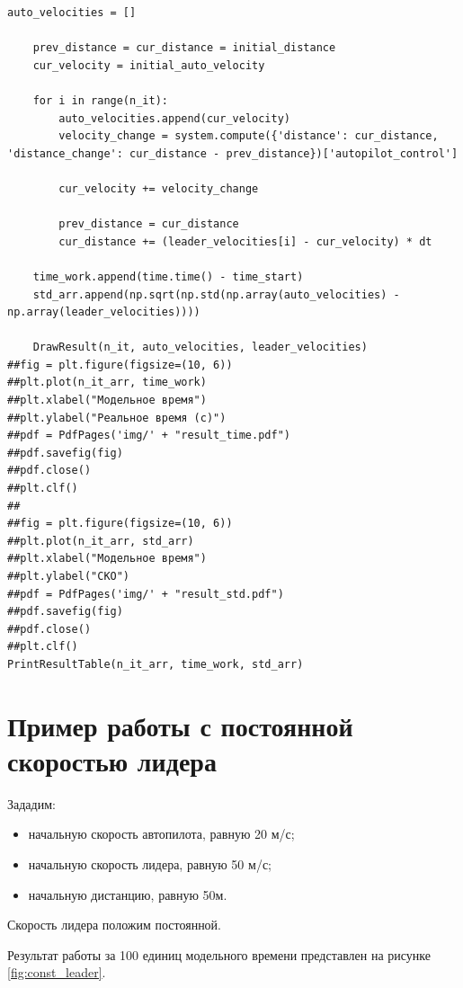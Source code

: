 \documentclass[12pt]{report}
\begin{document}
\begin{lstlisting}[label=lst:dt,caption=Реализация решения поставленной задачи]
    auto_velocities = []
    
    prev_distance = cur_distance = initial_distance
    cur_velocity = initial_auto_velocity

    for i in range(n_it):
        auto_velocities.append(cur_velocity)
        velocity_change = system.compute({'distance': cur_distance, 'distance_change': cur_distance - prev_distance})['autopilot_control']

        cur_velocity += velocity_change

        prev_distance = cur_distance
        cur_distance += (leader_velocities[i] - cur_velocity) * dt

    time_work.append(time.time() - time_start)
    std_arr.append(np.sqrt(np.std(np.array(auto_velocities) - np.array(leader_velocities))))

    DrawResult(n_it, auto_velocities, leader_velocities)
##fig = plt.figure(figsize=(10, 6))
##plt.plot(n_it_arr, time_work)
##plt.xlabel("Модельное время")
##plt.ylabel("Реальное время (с)")
##pdf = PdfPages('img/' + "result_time.pdf")
##pdf.savefig(fig)
##pdf.close()
##plt.clf()
##
##fig = plt.figure(figsize=(10, 6))
##plt.plot(n_it_arr, std_arr)
##plt.xlabel("Модельное время")
##plt.ylabel("СКО")
##pdf = PdfPages('img/' + "result_std.pdf")
##pdf.savefig(fig)
##pdf.close()
##plt.clf()
PrintResultTable(n_it_arr, time_work, std_arr)
\end{lstlisting}

\section{Пример работы с постоянной скоростью лидера}
Зададим:
\begin{itemize}
    \item начальную скорость автопилота, равную 20 м/с;
    \item начальную скорость лидера, равную 50 м/с;
    \item начальную дистанцию, равную 50м.
\end{itemize}

Скорость лидера положим постоянной.

Результат работы за 100 единиц модельного времени представлен на рисунке \ref{fig:const_leader}.
\end{document}
